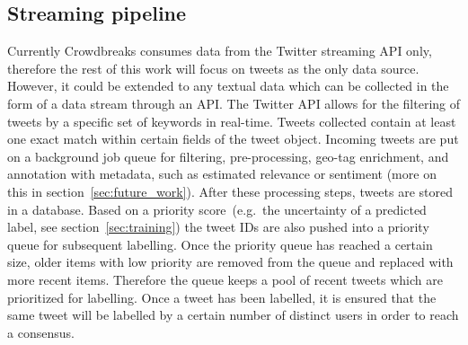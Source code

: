 \documentclass[a4paper, 11pt]{article}
\begin{document}
\subsection{Streaming pipeline}
\label{sec:streaming_pipeline}
Currently Crowdbreaks consumes data from the Twitter streaming API only, therefore the rest of this work will focus on tweets as the only data source.
However, it could be extended to any textual data which can be collected in the form of a data stream through an API.
The Twitter API allows for the filtering of tweets by a specific set of keywords in real-time.
Tweets collected contain at least one exact match within certain fields of the tweet object.
Incoming tweets are put on a background job queue for filtering, pre-processing, geo-tag enrichment, and annotation with metadata, such as estimated relevance or sentiment (more on this in section~\ref{sec:future_work}).
After these processing steps, tweets are stored in a database.
Based on a priority score~(e.g.\ the uncertainty of a predicted label, see section~\ref{sec:training}) the tweet IDs are also pushed into a priority queue for subsequent labelling.
Once the priority queue has reached a certain size, older items with low priority are removed from the queue and replaced with more recent items.
Therefore the queue keeps a pool of recent tweets which are prioritized for labelling.
Once a tweet has been labelled, it is ensured that the same tweet will be labelled by a certain number of distinct users in order to reach a consensus.
\end{document}
